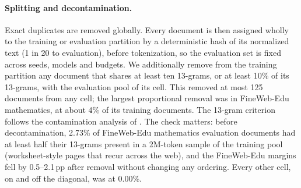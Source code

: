 \documentclass[11pt]{article}
\begin{document}
\paragraph{Splitting and decontamination.}
Exact duplicates are removed globally. Every document is then assigned
wholly to the training or evaluation partition by a deterministic hash of
its normalized text (1 in 20 to evaluation), before tokenization, so the
evaluation set is fixed across seeds, models and budgets. We additionally
remove from the training partition any document that shares at least ten
13-grams, or at least 10\% of its 13-grams, with the evaluation pool of its
cell. This removed at most 125 documents from any cell; the largest proportional
removal was in FineWeb-Edu mathematics, at about 4\% of its training
documents. The 13-gram criterion follows the contamination analysis of
\citet{brown2020gpt3}. The check matters: before decontamination, 2.73\% of
FineWeb-Edu mathematics evaluation documents had at least half their
13-grams present in a 2M-token sample of the training pool (worksheet-style
pages that recur across the web), and the FineWeb-Edu margins fell by
0.5--2.1\,pp after removal without changing any ordering. Every other cell,
on and off the diagonal, was at 0.00\%.
\end{document}
